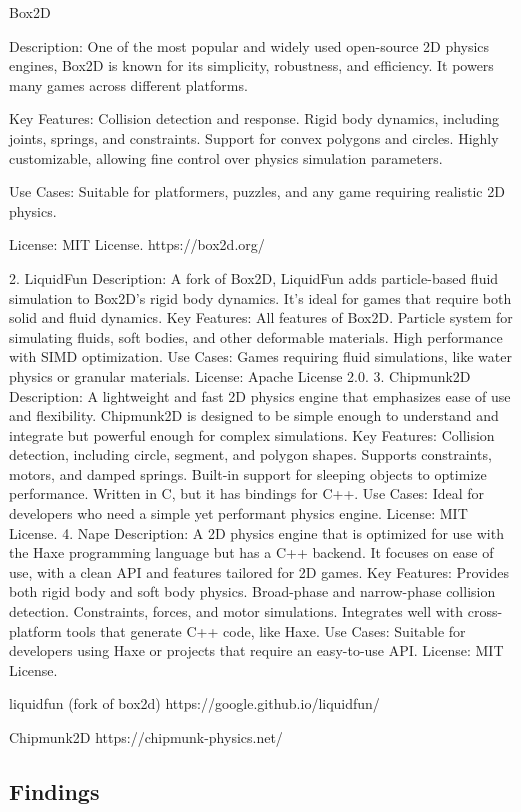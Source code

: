 \documentclass{projdoc}
\begin{document}
Box2D

Description: One of the most popular and widely used open-source 2D physics engines, Box2D is known for its simplicity, robustness, and efficiency. It powers many games across different platforms.

Key Features:
Collision detection and response.
Rigid body dynamics, including joints, springs, and constraints.
Support for convex polygons and circles.
Highly customizable, allowing fine control over physics simulation parameters.

Use Cases: Suitable for platformers, puzzles, and any game requiring realistic 2D physics.

License: MIT License.
https://box2d.org/


2. LiquidFun
Description: A fork of Box2D, LiquidFun adds particle-based fluid simulation to Box2D's rigid body dynamics. It's ideal for games that require both solid and fluid dynamics.
Key Features:
All features of Box2D.
Particle system for simulating fluids, soft bodies, and other deformable materials.
High performance with SIMD optimization.
Use Cases: Games requiring fluid simulations, like water physics or granular materials.
License: Apache License 2.0.
3. Chipmunk2D
Description: A lightweight and fast 2D physics engine that emphasizes ease of use and flexibility. Chipmunk2D is designed to be simple enough to understand and integrate but powerful enough for complex simulations.
Key Features:
Collision detection, including circle, segment, and polygon shapes.
Supports constraints, motors, and damped springs.
Built-in support for sleeping objects to optimize performance.
Written in C, but it has bindings for C++.
Use Cases: Ideal for developers who need a simple yet performant physics engine.
License: MIT License.
4. Nape
Description: A 2D physics engine that is optimized for use with the Haxe programming language but has a C++ backend. It focuses on ease of use, with a clean API and features tailored for 2D games.
Key Features:
Provides both rigid body and soft body physics.
Broad-phase and narrow-phase collision detection.
Constraints, forces, and motor simulations.
Integrates well with cross-platform tools that generate C++ code, like Haxe.
Use Cases: Suitable for developers using Haxe or projects that require an easy-to-use API.
License: MIT License.

liquidfun (fork of box2d)
https://google.github.io/liquidfun/

Chipmunk2D
https://chipmunk-physics.net/


\subsection{Findings}
\end{document}
